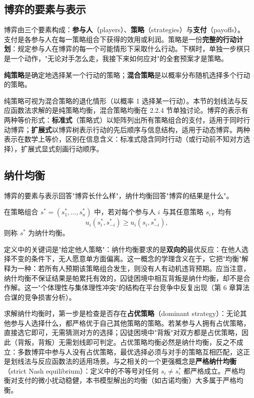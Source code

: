 \subsection{博弈的要素与表示}

博弈由三个要素构成：\textbf{参与人}（players）、\textbf{策略}（strategies）与\textbf{支付}（payoffs）。支付是各参与人在每一策略组合下获得的效用或利润。策略是一份\textbf{完整的行动计划}：规定参与人在博弈的每一个可能情形下采取什么行动。下棋时，单独一步棋只是一个动作，"无论对手怎么走，我接下来如何应对"的全套预案才是策略。

\begin{definition}
\textbf{纯策略}是确定地选择某一个行动的策略；\textbf{混合策略}是以概率分布随机选择多个行动的策略。
\end{definition}

纯策略可视为混合策略的退化情形（以概率 1 选择某一行动）。本节的划线法与反应函数法求解的是纯策略均衡，混合策略均衡在 2.2.4 节单独讨论。博弈的表示有两种等价形式：\textbf{标准式}（策略式）以矩阵列出所有策略组合的支付，适用于同时行动博弈；\textbf{扩展式}以博弈树表示行动的先后顺序与信息结构，适用于动态博弈。两种表示在数学上等价，区别在信息含义：标准式隐含同时行动（或行动前不知对方选择），扩展式显式刻画行动顺序。

\subsection{纳什均衡}

博弈的要素与表示回答"博弈长什么样"，纳什均衡回答"博弈的结果是什么"。

\begin{definition}
在策略组合 $s^* = (s_1^*, \ldots, s_n^*)$ 中，若对每个参与人 $i$ 与其任意策略 $s_i$，均有
\[
u_i(s_i^*, s_{-i}^*) \geq u_i(s_i, s_{-i}^*),
\]
则称 $s^*$ 为纳什均衡。
\end{definition}

定义中的关键词是"给定他人策略"：纳什均衡要求的是\textbf{双向的}最优反应：在他人选择不变的条件下，无人愿意单方面偏离。这一概念的学理含义在于，它把"均衡"解释为一种：若所有人预期该策略组合发生，则没有人有动机违背预期。应当注意，纳什均衡不保证结果是帕累托有效的，囚徒困境中相互背叛是纳什均衡，却不是合作解。这一"个体理性与集体理性冲突"的结构在平台竞争中反复出现（第 6 章算法合谋的竞争损害分析）。

求解纳什均衡时，第一步是检查是否存在\textbf{占优策略}（dominant strategy）：无论其他参与人选择什么，都严格优于自己其他策略的策略。若某参与人拥有占优策略，直接选它即可，无需猜测对方的选择；囚徒困境中"背叛"对双方都是占优策略，因此（背叛，背叛）无需划线即可判定。占优策略均衡必然是纳什均衡，反之不成立：多数博弈中参与人没有占优策略，最优选择必须与对手的策略互相匹配，这正是划线法与反应函数法的适用场景。与之相关的一个更强概念是\textbf{严格纳什均衡}（strict Nash equilibrium）：定义中的不等号对任何 $s_i \neq s_i^*$ 都严格成立。严格均衡对支付的微小扰动稳健，本书模型解出的均衡（如古诺均衡）大多属于严格均衡。

